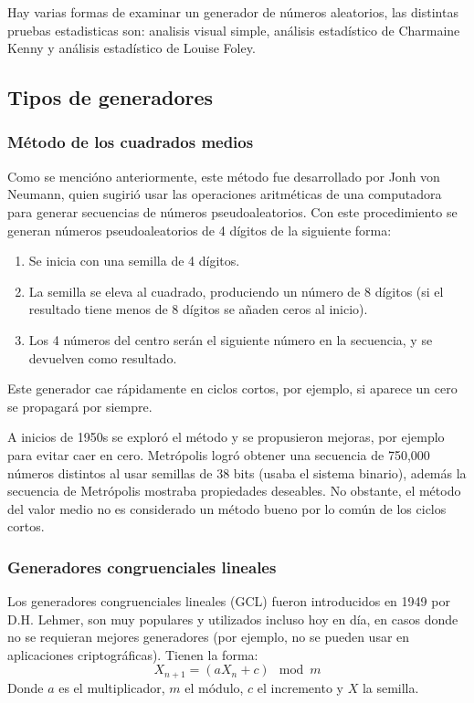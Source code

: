 Hay varias formas de examinar un generador de números aleatorios, las distintas pruebas estadisticas son: analisis visual simple, análisis estadístico de Charmaine Kenny y análisis estadístico de Louise Foley.

\subsection{Tipos de generadores}
\subsubsection{Método de los cuadrados medios}
Como se mencióno anteriormente, este método fue desarrollado por Jonh von Neumann, quien sugirió usar las operaciones aritméticas de una computadora para generar secuencias de números pseudoaleatorios. Con este procedimiento se generan números pseudoaleatorios de 4 dígitos de la siguiente forma:
\begin{enumerate}
    \item Se inicia con una semilla de 4 dígitos.
    \item La semilla se eleva al cuadrado, produciendo un número de 8 dígitos (si el resultado tiene menos de 8 dígitos se añaden ceros al inicio). 
    \item Los 4 números del centro serán el siguiente número en la secuencia, y se devuelven como resultado. 
\end{enumerate}
Este generador cae rápidamente en ciclos cortos, por ejemplo, si aparece un cero se propagará por siempre.

A inicios de 1950s se exploró el método y se propusieron mejoras, por ejemplo para evitar caer en cero. Metrópolis logró obtener una secuencia de 750,000 números distintos al usar semillas de 38 bits (usaba el sistema binario), además la secuencia de Metrópolis mostraba propiedades deseables. No obstante, el método del valor medio no es considerado un método bueno por lo común de los ciclos cortos.

\subsubsection{Generadores congruenciales lineales}
Los generadores congruenciales lineales (GCL) fueron introducidos en 1949 por D.H. Lehmer, son muy populares y utilizados incluso hoy en día, en casos donde no se requieran mejores generadores (por ejemplo, no se pueden usar en aplicaciones criptográficas). Tienen la forma:
\begin{equation}
    \label{eq:formula-gcl}
    X_{n+1} = (aX_{n}+c)\mod m
\end{equation}
Donde $a$ es el multiplicador, $m$ el módulo, $c$ el incremento y $X$ la semilla.

